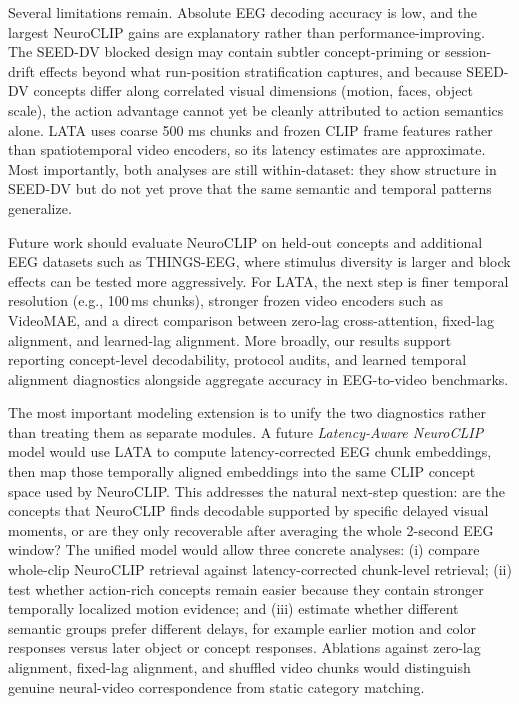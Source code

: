\documentclass{article}
\begin{document}
Several limitations remain. Absolute EEG decoding accuracy is low, and the largest NeuroCLIP gains are explanatory rather than performance-improving. The SEED-DV blocked design may contain subtler concept-priming or session-drift effects beyond what run-position stratification captures, and because SEED-DV concepts differ along correlated visual dimensions (motion, faces, object scale), the action advantage cannot yet be cleanly attributed to action semantics alone. LATA uses coarse 500 ms chunks and frozen CLIP frame features rather than spatiotemporal video encoders, so its latency estimates are approximate. Most importantly, both analyses are still within-dataset: they show structure in SEED-DV but do not yet prove that the same semantic and temporal patterns generalize.

Future work should evaluate NeuroCLIP on held-out concepts and additional EEG datasets
such as THINGS-EEG, where stimulus diversity is larger and block effects can be
tested more aggressively. For LATA, the next step is finer temporal resolution
(e.g., 100\,ms chunks), stronger frozen video encoders such as VideoMAE, and a
direct comparison between zero-lag cross-attention, fixed-lag alignment, and
learned-lag alignment. More broadly, our results support reporting concept-level
decodability, protocol audits, and learned temporal alignment diagnostics
alongside aggregate accuracy in EEG-to-video benchmarks.

The most important modeling extension is to unify the two diagnostics rather
than treating them as separate modules. A future \emph{Latency-Aware NeuroCLIP}
model would use LATA to compute latency-corrected EEG chunk embeddings, then map
those temporally aligned embeddings into the same CLIP concept space used by
NeuroCLIP. This addresses the natural next-step question: are the concepts that
NeuroCLIP finds decodable supported by specific delayed visual moments, or are
they only recoverable after averaging the whole 2-second EEG window? The unified
model would allow three concrete analyses: (i) compare whole-clip NeuroCLIP
retrieval against latency-corrected chunk-level retrieval; (ii) test whether
action-rich concepts remain easier because they contain stronger temporally
localized motion evidence; and (iii) estimate whether different semantic groups
prefer different delays, for example earlier motion and color responses versus later
object or concept responses. Ablations against zero-lag alignment, fixed-lag
alignment, and shuffled video chunks would distinguish genuine neural-video
correspondence from static category matching.
\end{document}

